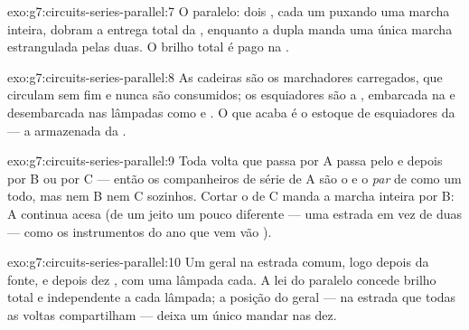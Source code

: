 \begin{solution}{exo:g7:circuits-series-parallel:7}
O paralelo: dois , cada um puxando uma marcha inteira, dobram a
entrega total da , enquanto a dupla  manda uma única
marcha estrangulada pelas duas. O brilho total é pago na .
\end{solution}

\begin{solution}{exo:g7:circuits-series-parallel:8}
As cadeiras são os marchadores carregados, que circulam sem fim e
nunca são consumidos; os esquiadores são a , embarcada na
 e desembarcada nas lâmpadas como  e . O que acaba é o
estoque de esquiadores da  --- a  armazenada da .
\end{solution}

\begin{solution}{exo:g7:circuits-series-parallel:9}
Toda volta que passa por A passa pelo  e depois por B ou
por C --- então os companheiros de série de A são o  e o
\emph{par} de  como um todo, mas nem B nem C sozinhos. Cortar o
 de C manda a marcha inteira por B: A continua acesa (de um jeito
um pouco diferente --- uma estrada em vez de duas --- como os
instrumentos do ano que vem vão ).
\end{solution}

\begin{solution}{exo:g7:circuits-series-parallel:10}
Um  geral na estrada comum, logo depois da fonte, e depois
dez  , com uma lâmpada cada. A lei do paralelo
concede brilho total e independente a cada lâmpada; a posição  do geral --- na estrada que todas as voltas compartilham ---
deixa um único  mandar nas dez.
\end{solution}

